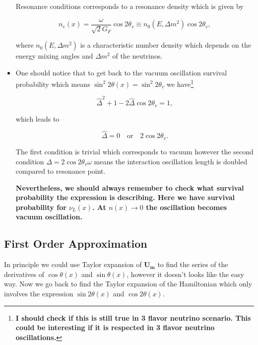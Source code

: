 \documentclass{tufte-handout}
\begin{document}
\begin{itemize}
Resonance conditions corresponds to a resonance density which is given by

\begin{equation*}
n_e(x) = \frac{\omega}{\sqrt{2}G_F } \cos 2\theta_v \equiv n_0(E,\Delta m^2) \cos 2\theta_v,
\end{equation*}

where $n_0(E,\Delta m^2)$ is a characteristic number density which depends on the energy mixing angles and $\Delta m^2$ of the neutrinos.


\item
One should notice that to get back to the vacuum oscillation survival probability which means $\sin^2 2\theta(x) = \sin^2 2\theta_v $ we have\footnote{\bf I should check if this is still true in 3 flavor neutrino scenario. This could be interesting if it is respected in 3 flavor neutrino oscillations.}

\begin{equation*}
\hat\Delta^2 + 1 - 2\hat\Delta \cos 2\theta_v = 1,
\end{equation*}

which leads to

\begin{equation*}
\hat\Delta = 0 \quad\text{or}\quad 2\cos 2\theta_v .
\end{equation*}

The first condition is trivial which corresponds to vacuum however the second condition $\Delta = 2\cos 2\theta_v \omega$ means the interaction oscillation length is doubled compared to resonance point.

{\bf{Nevertheless, we should always remember to check what survival probability the expression is describing. Here we have survival probability for $\nu_L(x)$. At $n(x)\to 0$ the oscillation becomes vacuum oscillation.}}

\end{itemize}




\subsection{First Order Approximation}


In principle we could use Taylor expansion of $\mathbf{U_m}$ to find the series of the derivatives of $\cos\theta(x)$ and $\sin\theta(x)$, however it doesn't looks like the easy way. Now we go back to find the Taylor expansion of the Hamiltonian which only involves the expression $\sin 2\theta(x)$ and $\cos 2\theta(x)$.
\end{document}
